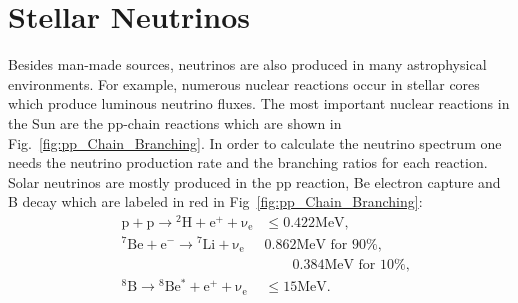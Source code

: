 \section{Stellar Neutrinos}


Besides man-made sources, neutrinos are also produced in many astrophysical environments. %
For example, numerous nuclear reactions occur in stellar cores which produce luminous neutrino fluxes. %
The most important nuclear reactions in the Sun are the pp-chain reactions which are shown in Fig.~\ref{fig:pp_Chain_Branching}. In order to calculate the neutrino spectrum one needs the neutrino production rate and the branching ratios for each reaction. Solar neutrinos are mostly produced in the pp reaction, Be electron capture and B decay which are labeled in red in Fig~\ref{fig:pp_Chain_Branching}:
\begin{align*}
&\mathrm{p+p\to {}^2H + e^+ +\nu_e}  & \mathrm{\leq 0.422MeV},\\
&\mathrm{{}^7Be + e^- \to {}^7Li + \nu_e} &\text{0.862MeV for 90\%},\\
&&\qquad \text{0.384MeV for 10\%}, \\
&\mathrm{{}^8B \to {}^8Be^* +e^+ +\nu_e}  & \mathrm{\leq 15 MeV}.
\end{align*}




